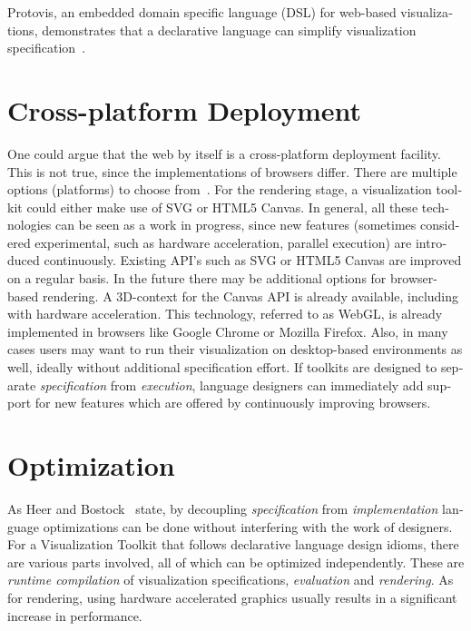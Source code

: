 \begin{english}
Protovis, an embedded domain specific language (DSL) for web-based visualizations, demonstrates that a declarative language can simplify visualization specification~\cite{Protovis09}.


\section{Cross-platform Deployment}

One could argue that the web by itself is a cross-platform deployment facility. This is not true, since the implementations of browsers differ. There are multiple options (platforms) to choose from~\cite{DeclarativeLD10}. For the rendering stage, a visualization toolkit could either make use of SVG or HTML5 Canvas. In general, all these technologies can be seen as a work in progress, since new features (sometimes considered experimental, such as hardware acceleration, parallel execution) are introduced continuously. Existing API's such as SVG or HTML5 Canvas are improved on a regular basis. In the future there may be additional options for browser-based rendering. A 3D-context for the Canvas API  is already available, including with hardware acceleration. This technology, referred to as WebGL, is already implemented in browsers like Google Chrome or Mozilla Firefox. Also, in many cases users may want to run their visualization on desktop-based environments as well, ideally without additional specification effort. If toolkits are designed to separate \emph{specification} from \emph{execution}, language designers can immediately add support for new features which are offered by continuously improving browsers.

\section{Optimization}

As Heer and Bostock~\cite{DeclarativeLD10} state, by decoupling \emph{specification} from \emph{implementation} language optimizations can be done without interfering with the work of designers. For a Visualization Toolkit that follows declarative language design idioms, there are various parts involved, all of which can be optimized independently. These are \emph{runtime compilation} of visualization specifications, \emph{evaluation} and \emph{rendering}. As for rendering, using hardware accelerated graphics usually results in a significant increase in performance.




\end{english}
